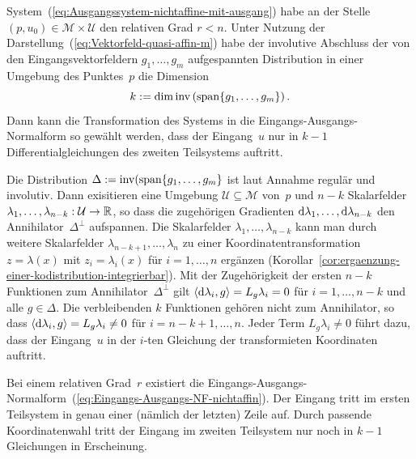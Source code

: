 \begin{proposition}
\label{prop:Auftreten-des-Eingangs-EA-NF}System~(\ref{eq:Ausgangssystem-nichtaffine-mit-ausgang})
habe an der Stelle $(p,u_{0})\in\mathcal{M}\times\mathcal{U}$ den
relativen Grad $r<n$. Unter Nutzung der Darstellung~(\ref{eq:Vektorfeld-quasi-affin-m})
habe der involutive Abschluss der von den Eingangsvektorfeldern $g_{1},\ldots,g_{m}$
aufgespannten Distribution in einer Umgebung des Punktes~$p$ die
Dimension 
\[
k:=\dim{\operatorname{inv}}\left({\operatorname{span}}\{g_{1},\ldots,g_{m}\}\right).
\]
Dann kann die Transformation des Systems in die Eingangs-Ausgangs-Normalform
so gewählt werden, dass der Eingang~$u$ nur in $k-1$ Differentialgleichungen
des zweiten Teilsystems auftritt.
\end{proposition}
\begin{proofsketch}Die Distribution $\Delta:={\operatorname{inv}}({\operatorname{span}}\{g_{1},\ldots,g_{m}\}$
ist laut Annahme regulär und involutiv. Dann exisitieren eine Umgebung
$\mathcal{U}\subseteq\mathcal{M}$ von~$p$ und $n-k$ Skalarfelder
$\lambda_{1},\ldots,\lambda_{n-k}:\mathcal{U}\to{\mathbb{R}}$, so dass die
zugehörigen Gradienten ${\mathrm{d}}\lambda_{1},\ldots,{\mathrm{d}}\lambda_{n-k}$ den
Annihilator~$\Delta^{\perp}$ aufspannen. Die Skalarfelder $\lambda_{1},\ldots,\lambda_{n-k}$
kann man durch weitere Skalarfelder $\lambda_{n-k+1},\ldots,\lambda_{n}$
zu einer Koordinatentransformation $z=\lambda(x)$ mit $z_{i}=\lambda_{i}(x)$
für $i=1,\ldots,n$ ergänzen (Korollar~\ref{cor:ergaenzung-einer-kodistribution-integrierbar}).
Mit der Zugehörigkeit der ersten $n-k$ Funktionen zum Annihilator~$\Delta^{\perp}$
gilt $\langle{\mathrm{d}}\lambda_{i},g\rangle=L_{g}\lambda_{i}=0$ für $i=1,\ldots,n-k$
und alle $g\in\Delta$. Die verbleibenden $k$ Funktionen gehören
nicht zum Annihilator, so dass $\langle{\mathrm{d}}\lambda_{i},g\rangle=L_{g}\lambda_{i}\neq0$
für $i=n-k+1,\ldots,n$. Jeder Term $L_{g}\lambda_{i}\neq0$ führt
dazu, dass der Eingang~$u$ in der $i$-ten Gleichung der transformieten
Koordinaten auftritt.

Bei einem relativen Grad~$r$ existiert die Eingangs-Ausgangs-Normalform~(\ref{eq:Eingangs-Ausgangs-NF-nichtaffin}).
Der Eingang tritt im ersten Teilsystem in genau einer (nämlich der
letzten) Zeile auf. Durch passende Koordinatenwahl tritt der Eingang
im zweiten Teilsystem nur noch in $k-1$ Gleichungen in Erscheinung.\end{proofsketch}
